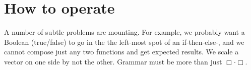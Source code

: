 \chapter{How to operate}





A number of subtle problems are 
mounting.  For example, we probably want a Boolean (true/false) to 
go in the the left-most spot of an if-then-else-, and we cannot compose 
just any two functions and get expected results.  We scale a vector on one side 
by not the other.  Grammar must be more than just $\Box\cdot \Box$.



